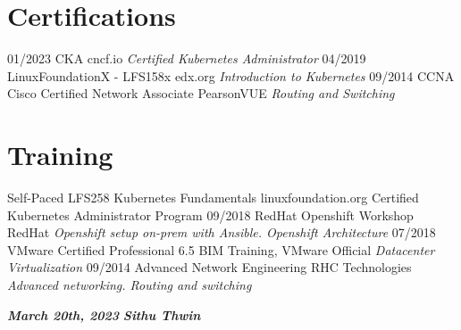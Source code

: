 \documentclass[]{friggeri-cv}
\begin{document}
\section{Certifications}
\begin{entrylist}
  \entry
  {01/2023}
  {CKA}
  {cncf.io}
  {\emph{Certified Kubernetes Administrator}}
  \entry
  {04/2019}
  {LinuxFoundationX - LFS158x}
  {edx.org}
  {\emph{Introduction to Kubernetes}}
  \entry
  {09/2014}
  {CCNA Cisco Certified Network Associate}
  {PearsonVUE}
  {\emph{Routing and Switching}}
\end{entrylist}

\section{Training}
\begin{entrylist}
  \entry
  {Self-Paced}
  {LFS258 Kubernetes Fundamentals}
  {linuxfoundation.org}
  {Certified Kubernetes Administrator Program}
  \entry
  {09/2018}
  {RedHat Openshift Workshop}
  {RedHat}
  {\emph{Openshift setup on-prem with Ansible. Openshift Architecture}}	\entry
  {07/2018}
  {VMware Certified Professional 6.5}
  {BIM Training, VMware Official}
  {\emph{Datacenter Virtualization}}
  \entry
  {09/2014}
  {Advanced Network Engineering}
  {RHC Technologies}
  {\emph{Advanced networking. Routing and switching}}
\end{entrylist}

\textbf{\emph{March 20th, 2023}}
\hfill
\textbf{\emph{Sithu Thwin}}
\end{document}

